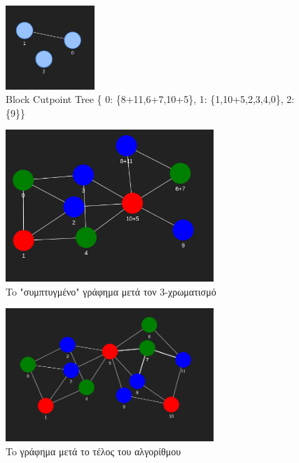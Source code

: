 \begin{figure}[H]
	\centering
	\includegraphics[width=0.3\textwidth]{pictures/coloring-block-cutpoint.png} 
	\caption{ Block Cutpoint Tree \{ 0: \{8+11,6+7,10+5\}, 1: \{1,10+5,2,3,4,0\}, 2: \{9\}\}}
	\label{fig:at-free-graph-pyvis-3-colouring-block-cutpoint}
\end{figure}


\begin{figure}[H]
	\centering
	\includegraphics[width=0.7\textwidth]{pictures/coloring-before-expansion.png} 
	\caption{To "συμπτυγμένο" γράφημα μετά τον 3-χρωματισμό}
	\label{fig:at-free-graph-pyvis-3-colouring-before-expansion}
\end{figure}

\begin{figure}[H]
	\centering
	\includegraphics[width=0.7\textwidth]{pictures/coloring-final.png} 
	\caption{To γράφημα μετά το τέλος του αλγορίθμου}
	\label{fig:at-free-graph-pyvis-3-colouring-final}
\end{figure}
